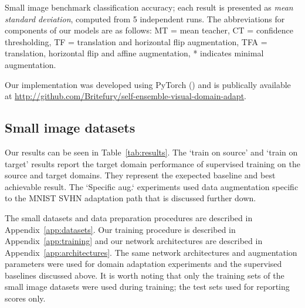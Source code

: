 \documentclass{article}
\begin{document}
\begin{table}[!t]
\begin{center}
\begin{threeparttable}
\caption{Small image benchmark classification accuracy; each result is presented as \emph{mean}  \emph{standard deviation}, computed from 5 independent runs. The abbreviations for components of our models are as follows: MT = mean teacher, CT = confidence thresholding, TF = translation and horizontal flip augmentation, TFA = translation, horizontal flip and affine augmentation, * indicates minimal augmentation.}
\label{tab:results}
\end{threeparttable}
\end{center}
\end{table}



Our implementation was developed using PyTorch (\cite{PyTorch}) and is publically available at \url{http://github.com/Britefury/self-ensemble-visual-domain-adapt}.

\subsection{Small image datasets}
\label{sec:exp:small}

Our results can be seen in Table~\ref{tab:results}. The `train on source' and `train on target' results report the target domain performance of supervised training on the source and target domains. They represent the exepected baseline and best achievable result. The `Specific aug.` experiments used data augmentation specific to the MNIST  SVHN adaptation path that is discussed further down.

The small datasets and data preparation procedures are described in Appendix~\ref{app:datasets}. Our training procedure is described in Appendix~\ref{app:training} and our network architectures are described in Appendix~\ref{app:architectures}. The same network architectures and augmentation parameters were used for domain adaptation experiments and the supervised baselines discussed above. It is worth noting that only the training sets of the small image datasets were used during training; the test sets used for reporting scores only.
\end{document}
